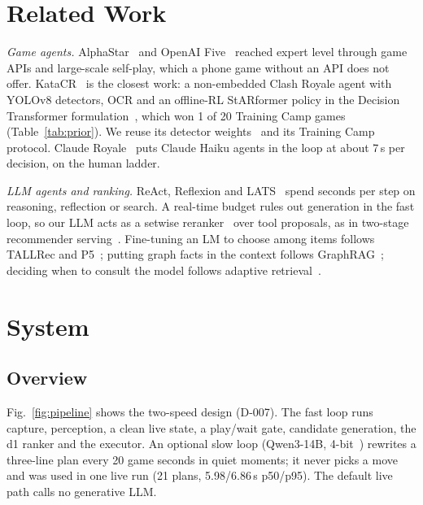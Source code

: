\documentclass[conference]{IEEEtran}
\begin{document}
\section{Related Work}

\emph{Game agents.} AlphaStar~\cite{vinyals2019alphastar} and OpenAI Five~\cite{berner2019dota} reached expert level through game APIs and large-scale self-play, which a phone game without an API does not offer. KataCR~\cite{wu2025nonembedded} is the closest work: a non-embedded Clash Royale agent with YOLOv8 detectors, OCR and an offline-RL StARformer policy in the Decision Transformer formulation~\cite{chen2021dt}, which won 1 of 20 Training Camp games (Table~\ref{tab:prior}). We reuse its detector weights~\cite{wu2024katacr} and its Training Camp protocol. Claude Royale~\cite{houseworth2025claudeRoyale} puts Claude Haiku agents in the loop at about 7\,s per decision, on the human ladder. %

\emph{LLM agents and ranking.} ReAct, Reflexion and LATS~\cite{yao2023react,shinn2023reflexion,zhou2024lats} spend seconds per step on reasoning, reflection or search. A real-time budget rules out generation in the fast loop, so our LLM acts as a setwise reranker~\cite{zhuang2024setwise,sun2023rankgpt} over tool proposals, as in two-stage recommender serving~\cite{yi2019twotower,lim2026l13}. Fine-tuning an LM to choose among items follows TALLRec and P5~\cite{bao2023tallrec,geng2022p5}; putting graph facts in the context follows GraphRAG~\cite{edge2024graphrag}; deciding when to consult the model follows adaptive retrieval~\cite{jiang2023flare,jeong2024adaptiverag}.

\section{System}
\label{sec:system}

\subsection{Overview}
Fig.~\ref{fig:pipeline} shows the two-speed design (D-007). The fast loop runs capture, perception, a clean live state, a play/wait gate, candidate generation, the d1 ranker and the executor. An optional slow loop (Qwen3-14B, 4-bit~\cite{qwen2025qwen3}) rewrites a three-line plan every 20 game seconds in quiet moments; it never picks a move and was used in one live run (21 plans, 5.98/6.86\,s p50/p95). The default live path calls no generative LLM. %
\end{document}
